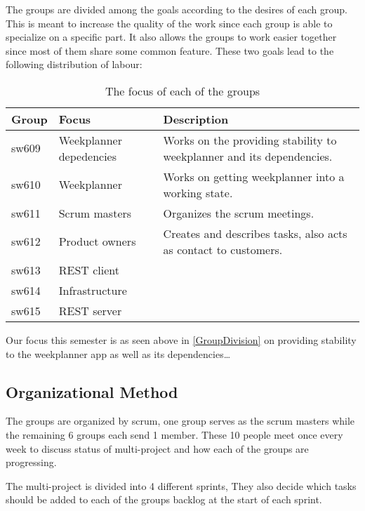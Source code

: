 The groups are divided among the goals according to the desires of each
group. This is meant to increase the quality of the work since each group is
able to specialize on a specific part. It also allows the groups to work easier
together since most of them share some common feature. These two goals lead to
the following distribution of labour:

\begin{table}[H]
\centering
\begin{tabular}{|p{1cm}|p{3cm}|p{8cm}|}
\hline
Group & Focus & Description \\ \hline
sw609 & Weekplanner depedencies & Works on the providing stability to
weekplanner and its dependencies.\\\hline 
sw610 & Weekplanner & Works on getting weekplanner into a working
state.\\
\hline sw611 & Scrum masters & Organizes the scrum meetings. \\\hline 
sw612 & Product owners & Creates and describes tasks, also acts as contact to
customers. \\\hline 
sw613 & REST client & \\ \hline

sw614 & Infrastructure & \\ \hline

sw615 & REST server & \\ \hline

\end{tabular}
\caption{The focus of each of the groups}
\label{GroupDivision}
\end{table}

Our focus this semester is as seen above in \autoref{GroupDivision} on
providing stability to the weekplanner app as well as its dependencies\ldots



\subsection{Organizational Method}

The groups are organized by scrum, one group serves as the scrum masters while
the remaining 6 groups each send 1 member. These 10 people meet once every week
to discuss status of multi-project and how each of the groups are progressing.


The multi-project is divided into 4 different sprints,
They also decide which tasks should be added to each of the groups backlog at
the start of each sprint.


